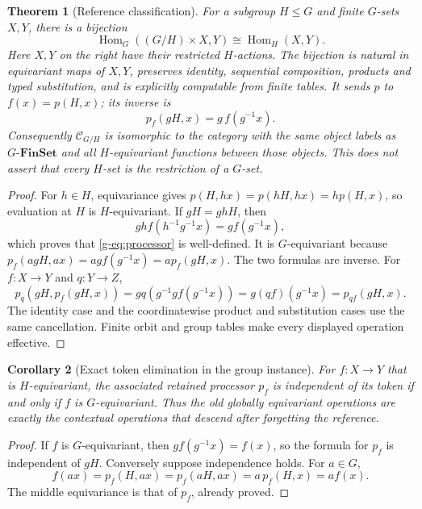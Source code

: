 \documentclass[11pt]{article}
\newtheorem{theorem}{Theorem}[section]
\newtheorem{corollary}[theorem]{Corollary}
\theoremstyle{definition}
\theoremstyle{remark}
\newcommand{\FinSet}{\mathbf{FinSet}}
\newcommand{\Hom}{\operatorname{Hom}}
\newcommand{\C}{\mathcal C}
\begin{document}
\begin{theorem}[Reference classification]\label{g-thm:reference}
For a subgroup $H\leq G$ and finite $G$-sets $X,Y$, there is a bijection
\begin{equation}\label{g-eq:classification}
 \Hom_G((G/H)\times X,Y)\cong\Hom_H(X,Y).
\end{equation}
Here $X,Y$ on the right have their restricted $H$-actions. The bijection is natural in equivariant maps of $X,Y$, preserves identity, sequential composition, products and typed substitution, and is explicitly computable from finite tables. It sends $p$ to $f(x)=p(H,x)$; its inverse is
\begin{equation}\label{g-eq:processor}
 p_f(gH,x)=g\,f(g^{-1}x).
\end{equation}
Consequently $\C_{G/H}$ is isomorphic to the category with the same object labels as $G\text{-}\FinSet$ and all $H$-equivariant functions between those objects. This does not assert that every $H$-set is the restriction of a $G$-set.
\end{theorem}
\begin{proof}
For $h\in H$, equivariance gives
$p(H,hx)=p(hH,hx)=h p(H,x)$, so evaluation at $H$ is $H$-equivariant. If $gH=ghH$, then
\[
 gh f(h^{-1}g^{-1}x)=g f(g^{-1}x),
\]
which proves that \eqref{g-eq:processor} is well-defined. It is $G$-equivariant because
$p_f(agH,ax)=ag f(g^{-1}x)=a p_f(gH,x)$.
The two formulas are inverse. For $f:X\to Y$ and $q:Y\to Z$,
\[
 p_q(gH,p_f(gH,x))
 =g q(g^{-1}g f(g^{-1}x))
 =g(qf)(g^{-1}x)=p_{qf}(gH,x).
\]
The identity case and the coordinatewise product and substitution cases use the same cancellation. Finite orbit and group tables make every displayed operation effective.\end{proof}

\begin{corollary}[Exact token elimination in the group instance]\label{g-cor:elimination}
For $f:X\to Y$ that is $H$-equivariant, the associated retained processor $p_f$ is independent of its token if and only if $f$ is $G$-equivariant. Thus the old globally equivariant operations are exactly the contextual operations that descend after forgetting the reference.
\end{corollary}
\begin{proof}
If $f$ is $G$-equivariant, then $g f(g^{-1}x)=f(x)$, so the formula for $p_f$ is independent of $gH$. Conversely suppose independence holds. For $a\in G$,
\[
 f(ax)=p_f(H,ax)=p_f(aH,ax)=a\,p_f(H,x)=a f(x).
\]
The middle equivariance is that of $p_f$, already proved.
\end{proof}
\end{document}
